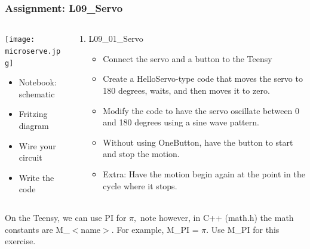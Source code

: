 \documentclass{beamer}
\begin{document}
\begin{frame}\frametitle{Assignment: L09\_Servo}
\begin{columns}
\begin{column}{4.5cm}
\begin{center}
\texttt{[image: microserve.jpg]}
\end{center}
\begin{itemize}
\item Notebook: schematic
\item Fritzing diagram
\item Wire your circuit
\item Write the code
\end{itemize}
\end{column}
\begin{column}{7.5cm}
\begin{enumerate}
\item L09\_01\_Servo
\begin{itemize}
\item Connect the servo and a button to the Teensy
\item Create a HelloServo-type code that moves the servo to 180 degrees, waits, and then moves it to zero.
\item Modify the code to have the servo oscillate between 0 and 180 degrees using a sine wave pattern.
\item Without using OneButton, have the button to start and stop the motion.
\item Extra: Have the motion begin again at the point in the cycle where it stops.
\end{itemize}	
\end{enumerate}
\end{column}
\end{columns}

\vspace{0.5 cm}

On the Teensy, we can use PI for $\pi,$ note however, in C++ (math.h) the math constants are M\_$<$name$>$. For example, M\_PI = $\pi$. Use M\_PI for this exercise.
\end{frame}
\end{document}
